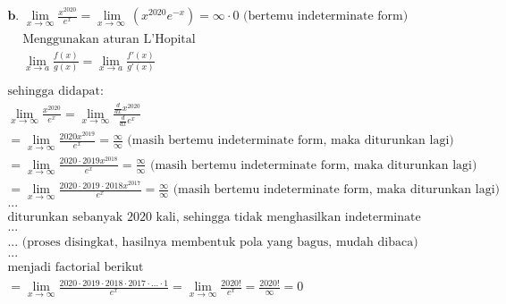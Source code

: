 \documentclass[12pt]{article}
\begin{document}
\begin{fleqn}[2em]
\begin{align*}
\boxed{
\begin{aligned}
  & \textbf{b. } \lim_{x \to \infty} \frac{x^{2020}}{e^x}
    = \lim_{x\to \infty \:}\left(x^{2020}e^{-x}\right)
    = \infty \cdot 0 \text{ (bertemu indeterminate form)} \\
  & \boxed{
    \begin{aligned}
      & \text{Menggunakan aturan L'Hopital} \\
      & \lim_{x \to a} \frac{f(x)}{g(x)} = \lim_{x \to a} \frac{f'(x)}{g'(x)} \\
    \end{aligned}
  } \\
  & \text{sehingga didapat: } \\
  & \lim_{x \to \infty} \frac{x^{2020}}{e^x}
    = \lim_{x \to \infty} \frac{\frac{d}{dx} x^{2020}}{\frac{d}{dx} e^x} \\
  & = \lim _{x\to \infty}\frac{2020x^{2019}}{e^x} = \frac{\infty}{\infty}
    \text{ (masih bertemu indeterminate form, maka diturunkan lagi)} \\
  & = \lim _{x\to \infty}\frac{2020 \cdot 2019 x^{2018}}{e^x} = \frac{\infty}{\infty}
    \text{ (masih bertemu indeterminate form, maka diturunkan lagi)} \\
  & = \lim _{x\to \infty}\frac{2020 \cdot 2019 \cdot 2018 x^{2017}}{e^x} = \frac{\infty}{\infty}
    \text{ (masih bertemu indeterminate form, maka diturunkan lagi)} \\
  & ... \\
  & \text{diturunkan sebanyak 2020 kali, sehingga tidak menghasilkan indeterminate form lagi} \\
  & ... \\
  & ... \text{ (proses disingkat, hasilnya membentuk pola yang bagus, mudah dibaca)} \\
  & ... \\
  & \text{menjadi factorial berikut} \\
  & = \lim _{x\to \infty}\frac{2020 \cdot 2019 \cdot 2018 \cdot 2017 \cdot ... \cdot 1}{e^x}
    = \lim _{x\to \infty}\frac{2020!}{e^x}
    = \frac{2020!}{\infty} = 0
\end{aligned}
}
\end{align*}


\end{fleqn}
\end{document}
